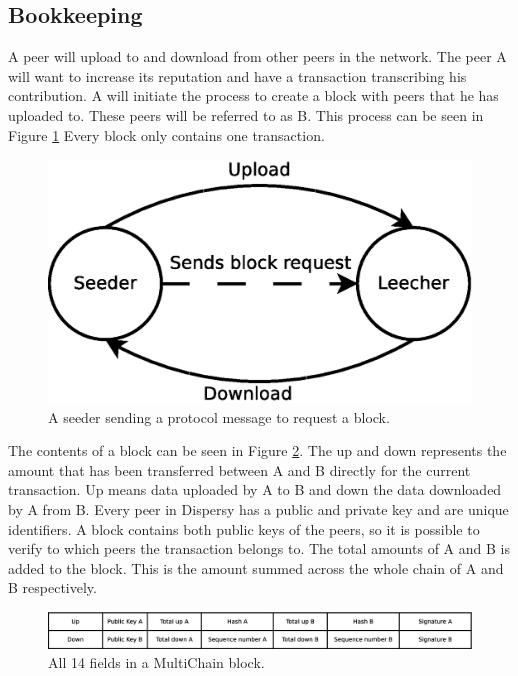 \subsection{Bookkeeping}
A peer will upload to and download from other peers in the network.
The peer A will want to increase its reputation and have a transaction transcribing his contribution.
A will initiate the process to create a block with peers that he has uploaded to.
These peers will be referred to as B.
This process can be seen in Figure \ref{fig:seeder-leecher}
Every block only contains one transaction.

\begin{figure}
	\centerline{\includegraphics[scale=0.3]{design/figs/seeder-leecher.eps}}
	\caption{A seeder sending a protocol message to request a block.}
	\label{fig:seeder-leecher}
\end{figure}

The contents of a block can be seen in Figure \ref{fig:block}.
The up and down represents the amount that has been transferred between A and B directly for the current transaction.
Up means data uploaded by A to B and down the data downloaded by A from B.
Every peer in Dispersy has a public and private key and are unique identifiers.
A block contains both public keys of the peers,
so it is possible to verify to which peers the transaction belongs to.
The total amounts of A and B is added to the block.
This is the amount summed across the whole chain of A and B respectively.

\begin{figure}
	\centerline{\includegraphics[scale=0.3]{design/figs/block.eps}}
	\caption{All 14 fields in a MultiChain block.}
	\label{fig:block}
\end{figure}

